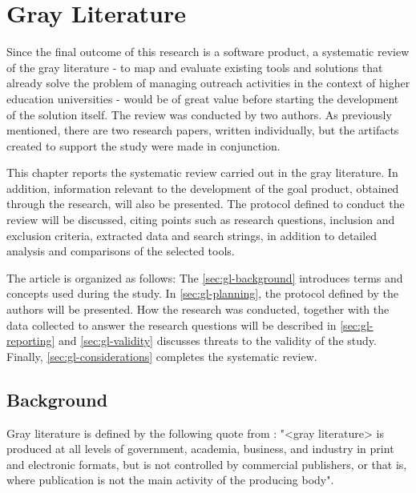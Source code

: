 \chapter{Gray Literature}\label{grayliterature}

Since the final outcome of this research is a software product, a systematic review of the gray literature - to map and evaluate existing tools and solutions that already solve the problem of managing outreach activities in the context of higher education universities - would be of great value before starting the development of the solution itself. The review was conducted by two authors. As previously mentioned, there are two research papers, written individually, but the artifacts created to support the study were made in conjunction.

This chapter reports the systematic review carried out in the gray literature. In addition, information relevant to the development of the goal product, obtained through the research, will also be presented. The protocol defined to conduct the review will be discussed, citing points such as research questions, inclusion and exclusion criteria, extracted data and search strings, in addition to detailed analysis and comparisons of the selected tools.

The article is organized as follows: The \autoref{sec:gl-background} introduces terms and concepts used during the study. In \autoref{sec:gl-planning}, the protocol defined by the authors will be presented. How the research was conducted, together with the data collected to answer the research questions will be described in \autoref{sec:gl-reporting} and \autoref{sec:gl-validity} discusses threats to the validity of the study. Finally, \autoref{sec:gl-considerations} completes the systematic review.

\section{Background}\label{sec:gl-background}

Gray literature is defined by the following quote from \cite{garousi2019guidelines}: "<gray literature> is produced at all levels of government, academia, business, and industry in print and electronic formats, but is not controlled by commercial publishers, or that is, where publication is not the main activity of the producing body".

